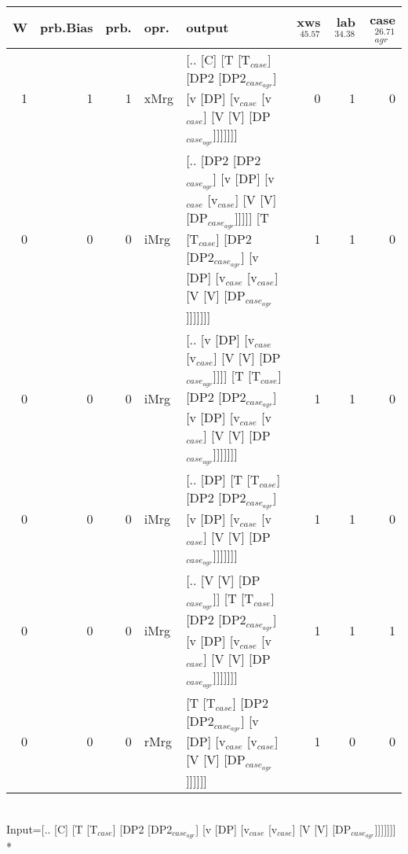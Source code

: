 \begin{tabularx}{\linewidth}{rrrlXrrr}
\hline
   W &   prb.Bias &   prb. & opr.   & output                                                                                                                                                        &   xws$^{45.57}$ &   lab$^{34.38}$ &   case$_{agr}^{26.71}$ \\
\hline
   1 &       1 &   1 & xMrg & [.. [C] [T [T$_{case}$] [DP2 [DP2$_{case_{agr}}$] [v [DP] [v$_{case}$ [v$_{case}$] [V [V] [DP$_{case_{agr}}$]]]]]]]                                                                   &             0 &             1 &                  0 \\
   0 &       0 &   0 & iMrg & [.. [DP2 [DP2$_{case_{agr}}$] [v [DP] [v$_{case}$ [v$_{case}$] [V [V] [DP$_{case_{agr}}$]]]]] [T [T$_{case}$] [DP2 [DP2$_{case_{agr}}$] [v [DP] [v$_{case}$ [v$_{case}$] [V [V] [DP$_{case_{agr}}$]]]]]]] &             1 &             1 &                  0 \\
   0 &       0 &   0 & iMrg & [.. [v [DP] [v$_{case}$ [v$_{case}$] [V [V] [DP$_{case_{agr}}$]]]] [T [T$_{case}$] [DP2 [DP2$_{case_{agr}}$] [v [DP] [v$_{case}$ [v$_{case}$] [V [V] [DP$_{case_{agr}}$]]]]]]]                      &             1 &             1 &                  0 \\
   0 &       0 &   0 & iMrg & [.. [DP] [T [T$_{case}$] [DP2 [DP2$_{case_{agr}}$] [v [DP] [v$_{case}$ [v$_{case}$] [V [V] [DP$_{case_{agr}}$]]]]]]]                                                                  &             1 &             1 &                  0 \\
   0 &       0 &   0 & iMrg & [.. [V [V] [DP$_{case_{agr}}$]] [T [T$_{case}$] [DP2 [DP2$_{case_{agr}}$] [v [DP] [v$_{case}$ [v$_{case}$] [V [V] [DP$_{case_{agr}}$]]]]]]]                                                 &             1 &             1 &                  1 \\
   0 &       0 &   0 & rMrg & [T [T$_{case}$] [DP2 [DP2$_{case_{agr}}$] [v [DP] [v$_{case}$ [v$_{case}$] [V [V] [DP$_{case_{agr}}$]]]]]]                                                                            &             1 &             0 &                  0 \\
\hline
\end{tabularx}\endgroup\\
\begingroup\scriptsize Input=[.. [C] [T [T$_{case}$] [DP2 [DP2$_{case_{agr}}$] [v [DP] [v$_{case}$ [v$_{case}$] [V [V] [DP$_{case_{agr}}$]]]]]]]\\*
